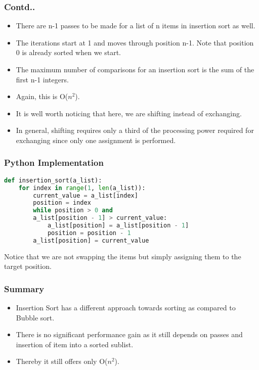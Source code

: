 \documentclass{beamer}
\begin{document}
\begin{frame}
\frametitle{Contd..}
\begin{itemize}
\item There are n-1 passes to be made for a list of n items in insertion sort as well.
\item The iterations start at 1 and moves through position n-1. Note that position 0 is already sorted when we start.
\item The maximum number of comparisons for an insertion sort is the sum of the first n-1 integers.
\item Again, this is O($n^2$).
\item It is well worth noticing that here, we are shifting instead of exchanging. 
\item In general, shifting requires only a third of the processing power required for exchanging since only one assignment is performed. 
\end{itemize}
\end{frame}

\begin{frame}[fragile]
\frametitle{Python Implementation}
\begin{lstlisting}[language=Python]
def insertion_sort(a_list):
    for index in range(1, len(a_list)):
        current_value = a_list[index]
        position = index
        while position > 0 and 
        a_list[position - 1] > current_value:
            a_list[position] = a_list[position - 1]
            position = position - 1
        a_list[position] = current_value
\end{lstlisting}
Notice that we are not swapping the items but simply assigning them to the target position.
\end{frame}

\begin{frame}
\frametitle{Summary}
\begin{itemize}
\item Insertion Sort has a different approach towards sorting as compared to Bubble sort.
\item There is no significant performance gain as it still depends on passes and insertion of item into a sorted sublist.
\item Thereby it still offers only O($n^2$).
\end{itemize}
\end{frame}
\end{document}
